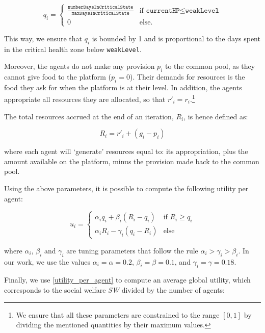 \begin{equation}\label{resources_needed}
    q_i=\begin{cases}
     \frac{\texttt{numberDaysInCriticalState}}{\texttt{maxDaysInCriticalState}} & \mbox{if } \texttt{currentHP}\leq \texttt{weakLevel}  \\ 
     0 & \mbox{else.}
     \end{cases}
\end{equation}

This way, we ensure that $q_i$ is bounded by 1 and is proportional to the days spent in the critical health zone below \texttt{weakLevel}.

Moreover, the agents do not make any provision $p_i$ to the common pool, as they cannot give food to the platform ($p_i=0$). Their demands for resources is the food they ask for when the platform is at their level. In addition, the agents appropriate all resources they are allocated, so that $r'_i=r_i$.\footnote{We ensure that all these parameters are constrained to the range $[0,1]$ by dividing the mentioned quantities by their maximum values.}

The total resources accrued at the end of an iteration, $R_i$, is hence defined as:

\begin{equation}\label{resources_accrued}
    R_i=r'_i+ (g_i-p_i)
\end{equation}

where each agent will `generate' resources equal to: its appropriation, plus the amount available on the platform, minus the provision made back to the common pool.

Using the above parameters, it is possible to compute the following utility per agent:

\begin{equation}\label{utility_per_agent}
    u_i=\begin{cases}
     \alpha_iq_i + \beta_i(R_i-q_i) & \mbox{if } R_i\geq q_i  \\ 
     \alpha_i R_i - \gamma_i(q_i-R_i) & \mbox{else}
     \end{cases}
\end{equation}


where $\alpha_i$, $\beta_i$ and $\gamma_i$ are tuning parameters that follow the rule $\alpha_i>\gamma_i>\beta_i$. In our work, we use the values $\alpha_i=\alpha=0.2$, $\beta_i=\beta=0.1$, and $\gamma_i=\gamma=0.18$.

Finally, we use \eqref{utility_per_agent} to compute an average global utility, which corresponds to the social welfare \textit{SW} divided by the number of agents:

